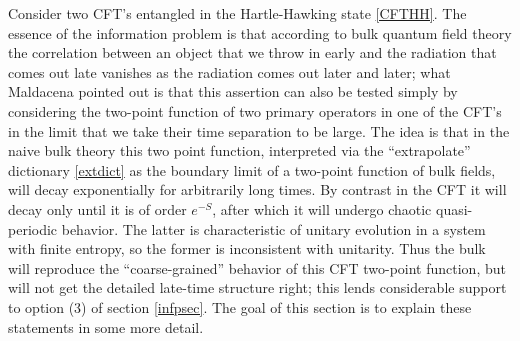\documentclass[12pt]{article}
\begin{document}
Consider two CFT's entangled in the Hartle-Hawking state \eqref{CFTHH}.  The essence of the information problem is that according to bulk quantum field theory the correlation between an object that we throw in early and the radiation that comes out late vanishes as the radiation comes out later and later; what Maldacena pointed out is that this assertion can also be tested simply by considering the two-point function of two primary operators in one of the CFT's in the limit that we take their time separation to be large.  The idea is that in the naive bulk theory this two point function, interpreted via the ``extrapolate'' dictionary \eqref{extdict} as the boundary limit of a two-point function of bulk fields, will decay exponentially for arbitrarily long times.  By contrast in the CFT it will decay only until it is of order $e^{-S}$, after which it will undergo chaotic quasi-periodic behavior.  The latter is characteristic of unitary evolution in a system with finite entropy, so the former is inconsistent with unitarity.  Thus the bulk will reproduce the ``coarse-grained'' behavior of this CFT two-point function, but will not get the detailed late-time structure right; this lends considerable support to option (3) of section \ref{infpsec}.  The goal of this section is to explain these statements in some more detail.  
\end{document}
